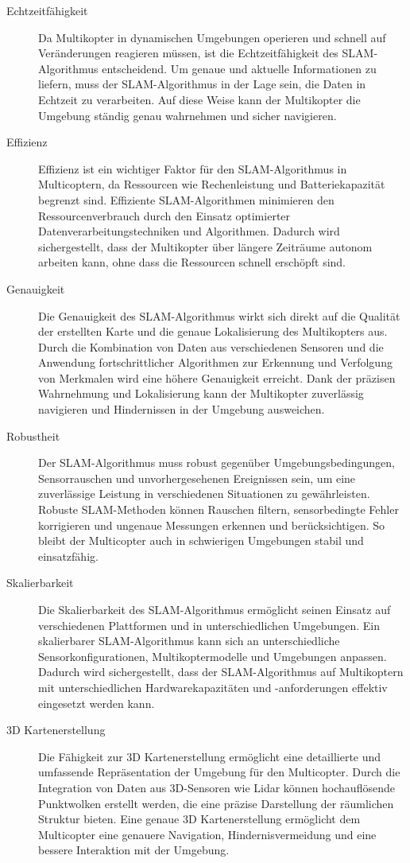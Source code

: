 \begin{description}
    \item[Echtzeitfähigkeit]{Da Multikopter in dynamischen Umgebungen operieren und schnell auf Veränderungen reagieren müssen, ist die Echtzeitfähigkeit des SLAM-Algorithmus entscheidend. Um genaue und aktuelle Informationen zu liefern, muss der SLAM-Algorithmus in der Lage sein, die Daten in Echtzeit zu verarbeiten. Auf diese Weise kann der Multikopter die Umgebung ständig genau wahrnehmen und sicher navigieren.}
    \item[Effizienz]{
        Effizienz ist ein wichtiger Faktor für den SLAM-Algorithmus in Multicoptern, da Ressourcen wie Rechenleistung und Batteriekapazität begrenzt sind. Effiziente SLAM-Algorithmen minimieren den Ressourcenverbrauch durch den Einsatz optimierter Datenverarbeitungstechniken und Algorithmen. Dadurch wird sichergestellt, dass der Multikopter über längere Zeiträume autonom arbeiten kann, ohne dass die Ressourcen schnell erschöpft sind.}
    \item[Genauigkeit]{Die Genauigkeit des SLAM-Algorithmus wirkt sich direkt auf die Qualität der erstellten Karte und die genaue Lokalisierung des Multikopters aus. Durch die Kombination von Daten aus verschiedenen Sensoren und die Anwendung fortschrittlicher Algorithmen zur Erkennung und Verfolgung von Merkmalen wird eine höhere Genauigkeit erreicht. Dank der präzisen Wahrnehmung und Lokalisierung kann der Multikopter zuverlässig navigieren und Hindernissen in der Umgebung ausweichen.}
    \item[Robustheit]{Der SLAM-Algorithmus muss robust gegenüber Umgebungsbedingungen, Sensorrauschen und unvorhergesehenen Ereignissen sein, um eine zuverlässige Leistung in verschiedenen Situationen zu gewährleisten. Robuste SLAM-Methoden können Rauschen filtern, sensorbedingte Fehler korrigieren und ungenaue Messungen erkennen und berücksichtigen. So bleibt der Multicopter auch in schwierigen Umgebungen stabil und einsatzfähig.}
    \item[Skalierbarkeit]{Die Skalierbarkeit des SLAM-Algorithmus ermöglicht seinen Einsatz auf verschiedenen Plattformen und in unterschiedlichen Umgebungen. Ein skalierbarer SLAM-Algorithmus kann sich an unterschiedliche Sensorkonfigurationen, Multikoptermodelle und Umgebungen anpassen. Dadurch wird sichergestellt, dass der SLAM-Algorithmus auf Multikoptern mit unterschiedlichen Hardwarekapazitäten und -anforderungen effektiv eingesetzt werden kann.}
    \item[3D Kartenerstellung]{Die Fähigkeit zur 3D Kartenerstellung ermöglicht eine detaillierte und umfassende Repräsentation der Umgebung für den Multicopter. Durch die Integration von Daten aus 3D-Sensoren wie Lidar können hochauflösende Punktwolken erstellt werden, die eine präzise Darstellung der räumlichen Struktur bieten. Eine genaue 3D Kartenerstellung ermöglicht dem Multicopter eine genauere Navigation, Hindernisvermeidung und eine bessere Interaktion mit der Umgebung.} 
\end{description}

